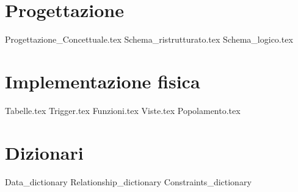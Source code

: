 \documentclass[a4paper,oneside, 11pt]{book}
\begin{document}
\chapter{Progettazione}
{Progettazione_Concettuale.tex}
{Schema_ristrutturato.tex}
{Schema_logico.tex}
\chapter{Implementazione fisica}
{Tabelle.tex}
{Trigger.tex}
{Funzioni.tex}
{Viste.tex}
{Popolamento.tex}
\appendix
\chapter{Dizionari}
{Data_dictionary}
{Relationship_dictionary}
{Constraints_dictionary}
\end{document}
